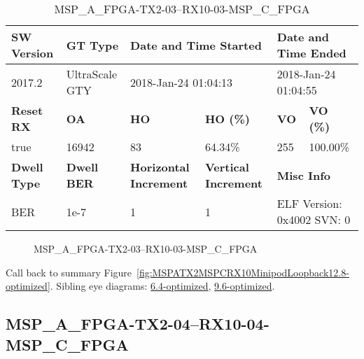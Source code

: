 \begin{table}[h]
\centering
\caption{MSP\_A\_FPGA-TX2-03--RX10-03-MSP\_C\_FPGA}
\label{tab:MSPAFPGATX203RX1003MSPCFPGA12.8-optimized}
\begin{tabular}{@{}|l|l|l|l|l|l|@{}}
\toprule
\textbf{SW Version}                & \textbf{GT Type}   & \multicolumn{2}{l|}{\textbf{Date and Time Started}}            & \multicolumn{2}{l|}{\textbf{Date and Time Ended}}        \\ \midrule
2017.2                       & UltraScale GTY          & \multicolumn{2}{l|}{2018-Jan-24 01:04:13}                   & \multicolumn{2}{l|}{2018-Jan-24 01:04:55}               \\ \midrule
\textbf{Reset RX}                  & \textbf{OA} & \textbf{HO}   & \textbf{HO (\%)} & \textbf{VO} & \textbf{VO (\%)} \\ \midrule
true & 16942        & 83          & 64.34\%        & 255        & 100.00\%       \\ \midrule
\textbf{Dwell Type}                & \textbf{Dwell BER} & \textbf{Horizontal Increment} & \textbf{Vertical Increment}    & \multicolumn{2}{l|}{\textbf{Misc Info}}                  \\ \midrule
BER                            & 1e-7        & 1        & 1           & \multicolumn{2}{l|}{ELF Version: 0x4002 SVN: 0}                         \\ \bottomrule
\end{tabular}
\end{table}

\begin{figure}[h]
\caption{MSP\_A\_FPGA-TX2-03--RX10-03-MSP\_C\_FPGA} \label{fig:MSPAFPGATX203RX1003MSPCFPGA12.8-optimized}
\end{figure}

Call back to summary Figure~\ref{fig:MSPATX2MSPCRX10MinipodLoopback12.8-optimized}.
Sibling eye diagrams: \hyperref[sec:MSPAFPGATX203RX1003MSPCFPGA6.4-optimized]{6.4-optimized}, \hyperref[sec:MSPAFPGATX203RX1003MSPCFPGA9.6-optimized]{9.6-optimized}.

\clearpage
\newpage


\subsection{MSP\_A\_FPGA-TX2-04--RX10-04-MSP\_C\_FPGA}\label{sec:MSPAFPGATX204RX1004MSPCFPGA12.8-optimized}

